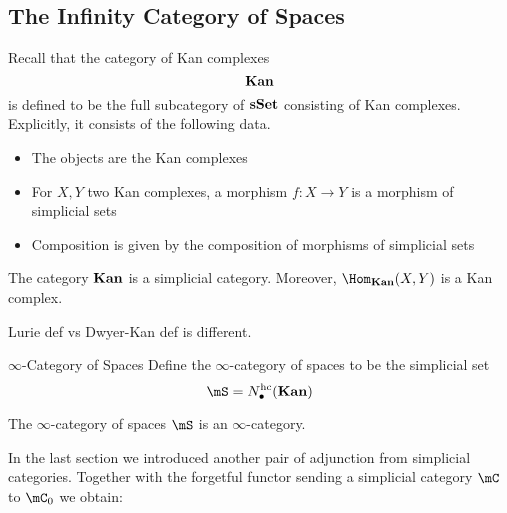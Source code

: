 \documentclass[a4paper]{article}
\begin{document}
\subsection{The Infinity Category of Spaces}
Recall that the category of Kan complexes $$\bold{Kan}$$ is defined to be the full subcategory of $\bold{sSet}$ consisting of Kan complexes. Explicitly, it consists of the following data. 
\begin{itemize}
\item The objects are the Kan complexes
\item For $X,Y$ two Kan complexes, a morphism $f:X\to Y$ is a morphism of simplicial sets
\item Composition is given by the composition of morphisms of simplicial sets
\end{itemize}

\begin{lmm}{}{} The category $\bold{Kan}$ is a simplicial category. Moreover, $\Hom_\bold{Kan}(X,Y)$ is a Kan complex. 
\end{lmm}

Lurie def vs Dwyer-Kan def is different. 

\begin{defn}{$\infty$-Category of Spaces}{} Define the $\infty$-category of spaces to be the simplicial set $$\mS=N_\bullet^\text{hc}(\bold{Kan})$$
\end{defn}

\begin{lmm}{}{} The $\infty$-category of spaces $\mS$ is an $\infty$-category. 
\end{lmm}

In the last section we introduced another pair of adjunction from simplicial categories. Together with the forgetful functor sending a simplicial category $\mC$ to $\mC_0$ we obtain: \\~\\
\\~\\
\end{document}
